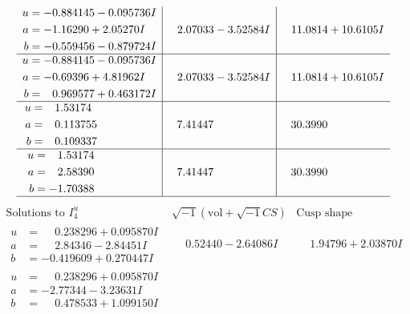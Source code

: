\documentclass[1p]{elsarticle_modified}
\theoremstyle{definition}
\newcommand{\I}{\sqrt{-1}}
\begin{document}
$$\begin{array}{c|c|c}
\begin{aligned}
u &= -0.884145 - 0.095736 I \\
a &= -1.16290 + 2.05270 I \\
b &= -0.559456 - 0.879724 I\end{aligned}
 & \phantom{-}2.07033 - 3.52584 I & \phantom{-}11.0814 + 10.6105 I \\ \hline\begin{aligned}
u &= -0.884145 - 0.095736 I \\
a &= -0.69396 + 4.81962 I \\
b &= \phantom{-}0.969577 + 0.463172 I\end{aligned}
 & \phantom{-}2.07033 - 3.52584 I & \phantom{-}11.0814 + 10.6105 I \\ \hline\begin{aligned}
u &= \phantom{-}1.53174\phantom{ +0.000000I} \\
a &= \phantom{-}0.113755\phantom{ +0.000000I} \\
b &= \phantom{-}0.109337\phantom{ +0.000000I}\end{aligned}
 & \phantom{-}7.41447\phantom{ +0.000000I} & \phantom{-}30.3990\phantom{ +0.000000I} \\ \hline\begin{aligned}
u &= \phantom{-}1.53174\phantom{ +0.000000I} \\
a &= \phantom{-}2.58390\phantom{ +0.000000I} \\
b &= -1.70388\phantom{ +0.000000I}\end{aligned}
 & \phantom{-}7.41447\phantom{ +0.000000I} & \phantom{-}30.3990\phantom{ +0.000000I}\\
 \hline 
 \end{array}$$\newpage$$\begin{array}{c|c|c}  
\text{Solutions to }I^u_{4}& \I (\text{vol} + \sqrt{-1}CS) & \text{Cusp shape}\\
 \hline 
\begin{aligned}
u &= \phantom{-}0.238296 + 0.095870 I \\
a &= \phantom{-}2.84346 - 2.84451 I \\
b &= -0.419609 + 0.270447 I\end{aligned}
 & \phantom{-}0.52440 - 2.64086 I & \phantom{-}1.94796 + 2.03870 I \\ \hline\begin{aligned}
u &= \phantom{-}0.238296 + 0.095870 I \\
a &= -2.77344 - 3.23631 I \\
b &= \phantom{-}0.478533 + 1.099150 I\end{aligned}

\end{array}$$
\end{document}
